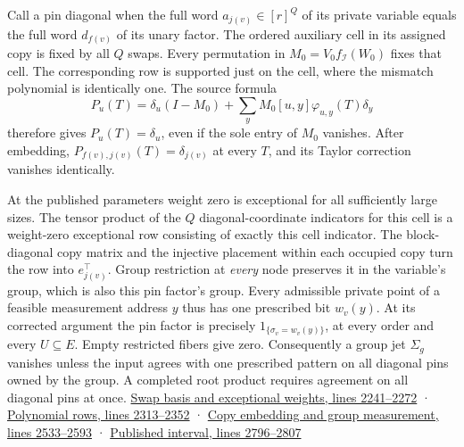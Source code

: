 \documentclass[
  11pt,
]{article}
\begin{document}
Call a pin diagonal when the full word \(a_{j(v)}\in[r]^Q\) of its
private variable equals the full word \(d_{f(v)}\) of its unary factor.
The ordered auxiliary cell in its assigned copy is fixed by all \(Q\)
swaps. Every permutation in \(M_0=V_0f_{\mathcal I}(W_0)\) fixes that
cell. The corresponding row is supported just on the cell, where the
mismatch polynomial is identically one. The source formula \[
 P_u(T)=\delta_u(I-M_0)+\sum_y M_0[u,y]\varphi_{u,y}(T)\delta_y
\] therefore gives \(P_u(T)=\delta_u\), even if the sole entry of
\(M_0\) vanishes. After embedding, \(P_{f(v),j(v)}(T)=\delta_{j(v)}\) at
every \(T\), and its Taylor correction vanishes identically.

At the published parameters weight zero is exceptional for all
sufficiently large sizes. The tensor product of the \(Q\)
diagonal-coordinate indicators for this cell is a weight-zero
exceptional row consisting of exactly this cell indicator. The
block-diagonal copy matrix and the injective placement within each
occupied copy turn the row into \(e_{j(v)}^\top\). Group restriction at
\emph{every} node preserves it in the variable's group, which is also
this pin factor's group. Every admissible private point of a feasible
measurement address \(y\) thus has one prescribed bit \(w_v(y)\). At its
corrected argument the pin factor is precisely
\(1_{\{\sigma_v=w_v(y)\}}\), at every order and every \(U\subseteq E\).
Empty restricted fibers give zero. Consequently a group jet \(\Sigma_g\)
vanishes unless the input agrees with one prescribed pattern on all
diagonal pins owned by the group. A completed root product requires
agreement on all diagonal pins at once.
\href{https://github.com/openai/math/blob/main/preprints/The-Exponential-Time-Hypothesis-is-False-October-25-2026/build/main_full_version.tex\#L2241}{Swap
basis and exceptional weights, lines 2241--2272} ·
\href{https://github.com/openai/math/blob/main/preprints/The-Exponential-Time-Hypothesis-is-False-October-25-2026/build/main_full_version.tex\#L2313}{Polynomial
rows, lines 2313--2352} ·
\href{https://github.com/openai/math/blob/main/preprints/The-Exponential-Time-Hypothesis-is-False-October-25-2026/build/main_full_version.tex\#L2533}{Copy
embedding and group measurement, lines 2533--2593} ·
\href{https://github.com/openai/math/blob/main/preprints/The-Exponential-Time-Hypothesis-is-False-October-25-2026/build/main_full_version.tex\#L2796}{Published
interval, lines 2796--2807}
\end{document}
